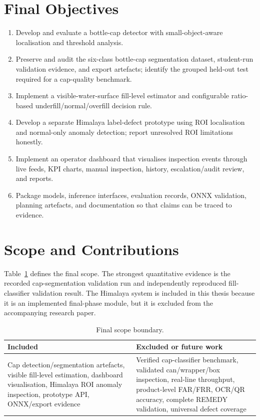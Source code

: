 \documentclass[12pt,a4paper]{report}
\begin{document}
\section{Final Objectives}
\begin{enumerate}[label=O\arabic*.,leftmargin=0.55in]
\item Develop and evaluate a bottle-cap detector with small-object-aware localisation and threshold analysis.
\item Preserve and audit the six-class bottle-cap segmentation dataset, student-run validation evidence, and export artefacts; identify the grouped held-out test required for a cap-quality benchmark.
\item Implement a visible-water-surface fill-level estimator and configurable ratio-based underfill/normal/overfill decision rule.
\item Develop a separate Himalaya label-defect prototype using ROI localisation and normal-only anomaly detection; report unresolved ROI limitations honestly.
\item Implement an operator dashboard that visualises inspection events through live feeds, KPI charts, manual inspection, history, escalation/audit review, and reports.
\item Package models, inference interfaces, evaluation records, ONNX validation, planning artefacts, and documentation so that claims can be traced to evidence.
\end{enumerate}

\section{Scope and Contributions}
Table~\ref{tab:scope} defines the final scope. The strongest quantitative evidence is the recorded cap-segmentation validation run and independently reproduced fill-classifier validation result. The Himalaya system is included in this thesis because it is an implemented final-phase module, but it is excluded from the accompanying research paper.
\begin{table}[ht]\centering\caption{Final scope boundary.}\label{tab:scope}\begin{tabularx}{\textwidth}{p{}X}
\toprule Included & Excluded or future work\\\midrule
Cap detection/segmentation artefacts, visible fill-level estimation, dashboard visualisation, Himalaya ROI anomaly inspection, prototype API, ONNX/export evidence & Verified cap-classifier benchmark, validated can/wrapper/box inspection, real-line throughput, product-level FAR/FRR, OCR/QR accuracy, complete REMEDY validation, universal defect coverage\\\bottomrule\end{tabularx}\end{table}
\end{document}
